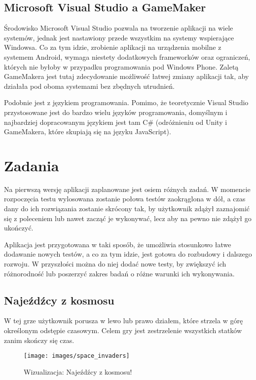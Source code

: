 \documentclass[openright]{xmgr}
\begin{document}
\subsection{Microsoft Visual Studio a GameMaker}
Środowisko Microsoft Visual Studio pozwala na tworzenie aplikacji na wiele
systemów, jednak jest nastawiony przede wszystkim na systemy wspierające
Windowsa. Co za tym idzie, zrobienie aplikacji na
urządzenia mobilne z systemem Android, wymaga niestety dodatkowych frameworków
oraz ograniczeń, których nie byłoby w przypadku programowania
pod Windows Phone. Zaletą GameMakera jest tutaj zdecydowanie możliwość łatwej zmiany aplikacji tak, aby działała pod oboma systemami
bez zbędnych utrudnień.

Podobnie jest z językiem programowania. Pomimo, że teoretycznie Visual Studio przystosowane jest do bardzo wielu języków programowania, domyślnym
i najbardziej dopracowanym językiem jest tam C\# (odróżnieniu od Unity i GameMakera, które skupiają się na języku JavaScript).



\section{Zadania}
Na pierwszą wersję aplikacji zaplanowane jest osiem różnych zadań. W momencie
rozpoczęcia testu wylosowana zostanie połowa testów zaokrąglona w
dół, a czas dany do ich rozwiązania zostanie skrócony tak, by użytkownik
zdążył zaznajomić się z poleceniem lub nawet zacząć je wykonywać,
lecz aby na pewno nie zdążył go ukończyć.

Aplikacja jest przygotowana w taki sposób, że umożliwia stosunkowo łatwe
dodawanie nowych testów, a co za tym idzie, jest gotowa do rozbudowy
i dalszego rozwoju. W przyszłości można do niej dodać nowe testy, by
zwiększyć ich różnorodność lub poszerzyć zakres badań o różne warunki ich
wykonywania.

\subsection{Najeźdźcy z kosmosu}
W tej grze użytkownik porusza w lewo lub prawo działem, które strzela w górę
określonym odstępie czasowym. Celem gry jest zestrzelenie wszystkich statków zanim skończy się czas.

\begin{figure}[h]
\centering
\texttt{[image: images/space\_invaders]}
\caption{Wizualizacja: Najeźdźcy z kosmosu!}
\label{fig:space_invaders}
\end{figure}
\end{document}
